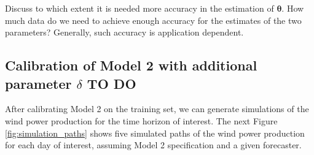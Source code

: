 \documentclass[11pt]{article}
\theoremstyle{definition}
\begin{document}
{\color{red} Discuss to which extent it is needed more accuracy in the estimation of $\bm{\theta}$. How much data do we need to achieve enough accuracy for the estimates of the two parameters? Generally, such accuracy is application dependent.}

\subsection{Calibration of Model 2 with additional parameter $\delta$ TO DO}


After calibrating Model 2 on the training set, we can generate simulations of the wind power production for the time horizon of interest. The next Figure \ref{fig:simulation_paths} shows five simulated paths of the wind power production for each day of interest, assuming Model 2 specification and a given forecaster.
\end{document}
